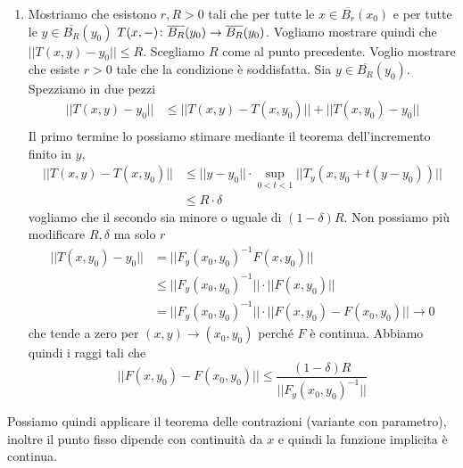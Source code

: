 \documentclass[a4paper]{article}
\begin{document}
\begin{radioactive}
\begin{snippetproof}{}
\begin{enumerate}
            \[
                \sup_{\substack{x \in \overline{B_r}(x_0) \\ y \in \overline{B_R}(y_0)}} ||T_y(x,y)|| \leq \delta
            \]
            e \(\delta\) è uniforme rispetto ad \(x\).
        \item Mostriamo che esistono \(r,R >0\)
            tali che per tutte le \(x \in \overline{B_r}(x_0)\)
            e per tutte le \(y \in \overline{B_R}(y_0)\)
            \(T(x, -) \colon \overline{B_R}(y_0) \to \overline{B_R}(y_0)\).
            Vogliamo mostrare quindi che \(||T(x,y) - y_0 || \leq R\).
            Scegliamo \(R\) come al punto precedente.
            Voglio mostrare che esiste \(r>0\) tale che la condizione è soddisfatta.
            Sia \(y \in \overline{B_R}(y_0)\). Spezziamo in due pezzi
            \begin{align*}
                ||T(x,y) - y_0|| &\leq ||T(x,y) - T(x, y_0)|| + ||T(x,y_0) - y_0|| \\
            \end{align*}
            Il primo termine lo possiamo stimare mediante il teorema dell'incremento finito
            in \(y\),
            \begin{align*}
                ||T(x,y)-T(x,y_0)|| &\leq ||y-y_0|| \cdot \sup_{0<t<1} ||T_y(x, y_0 + t(y-y_0))|| \\
                &\leq R \cdot \delta
            \end{align*}
            vogliamo che il secondo sia minore o uguale di \((1-\delta)R\).
            Non possiamo più modificare \(R, \delta\) ma solo \(r\)
            \begin{align*}
                ||T(x,y_0) - y_0|| &= ||F_y(x_0, y_0)^{-1} F(x, y_0)|| \\
                &\leq ||F_y(x_0, y_0)^{-1}|| \cdot ||F(x,y_0)|| \\
                &= ||F_y(x_0, y_0)^{-1}|| \cdot ||F(x,y_0) - F(x_0, y_0)|| \to 0
            \end{align*}
            che tende a zero per \((x,y) \to (x_0, y_0)\) perché \(F\) è continua.
            Abbiamo quindi i raggi tali che
            \[
                ||F(x, y_0) - F(x_0, y_0)|| \leq \frac{(1-\delta)R}{||F_y(x_0, y_0)^{-1}||}
            \]
    \end{enumerate}
    Possiamo quindi applicare il teorema delle contrazioni (variante con parametro),
    inoltre il punto fisso dipende con continuità da \(x\) e quindi la funzione implicita è continua.
\end{snippetproof}
\end{radioactive}
\end{document}
